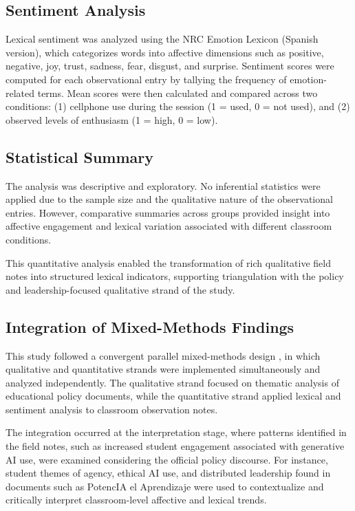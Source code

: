 \documentclass[english]{textolivre}
\begin{document}
\subsection{Sentiment Analysis}
Lexical sentiment was analyzed using the NRC Emotion Lexicon (Spanish version), which categorizes words into affective dimensions such as positive, negative, joy, trust, sadness, fear, disgust, and surprise. Sentiment scores were computed for each observational entry by tallying the frequency of emotion-related terms. Mean scores were then calculated and compared across two conditions: (1) cellphone use during the session (1 = used, 0 = not used), and (2) observed levels of enthusiasm (1 = high, 0 = low).

\subsection{Statistical Summary}
The analysis was descriptive and exploratory. No inferential statistics were applied due to the sample size and the qualitative nature of the observational entries. However, comparative summaries across groups provided insight into affective engagement and lexical variation associated with different classroom conditions.

This quantitative analysis enabled the transformation of rich qualitative field notes into structured lexical indicators, supporting triangulation with the policy and leadership-focused qualitative strand of the study.

\subsection{Integration of Mixed-Methods Findings}
This study followed a convergent parallel mixed-methods design \cite{creswell2018designing}, in which qualitative and quantitative strands were implemented simultaneously and analyzed independently. The qualitative strand focused on thematic analysis of educational policy documents, while the quantitative strand applied lexical and sentiment analysis to classroom observation notes.

The integration occurred at the interpretation stage, where patterns identified in the field notes, such as increased student engagement associated with generative AI use, were examined considering the official policy discourse. For instance, student themes of agency, ethical AI use, and distributed leadership found in documents such as PotencIA el Aprendizaje were used to contextualize and critically interpret classroom-level affective and lexical trends.
\end{document}
